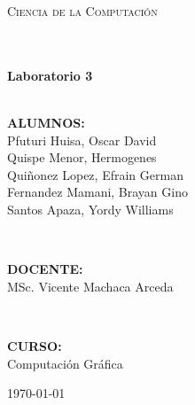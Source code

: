 \documentclass[11pt]{article}
\begin{document}
\begin{center}
\begin{minipage}{0.9\textwidth} 
\begin{center}																					%
\textsc{\LARGE Ciencia de la Computación}
\end{center}
\end{minipage}\\[0.5cm]
 			\vspace*{1cm}																		%
\HRule \\[0.4cm]																	%
{ \huge \bfseries Laboratorio 3
}\\[0.4cm]	%
\HRule \\[1.5cm]																	%
\begin{minipage}{0.46\textwidth}													%
\begin{flushleft} \large															%
\centering

\textbf{ALUMNOS:}\\
Pfuturi Huisa, Oscar David\\
Quispe Menor, Hermogenes\\
Quiñonez Lopez, Efrain German\\
Fernandez Mamani, Brayan Gino\\
Santos Apaza, Yordy Williams

\	\vfill

\textbf{DOCENTE:} \\
MSc. Vicente Machaca Arceda

\	\vfill

\textbf{CURSO:}\\
Computación Gráfica

\end{flushleft}																		%
\end{minipage}		
\begin{minipage}{0.70\textwidth}		
\vspace{-0.6cm}											%
\end{minipage}	
\vspace*{1cm}
 	
\vspace{3cm} 																				
\begin{center}																					
{\large \today}																	%
 			\end{center}												  						
\end{center}							 								\newpage
\newpage																
\end{document}
